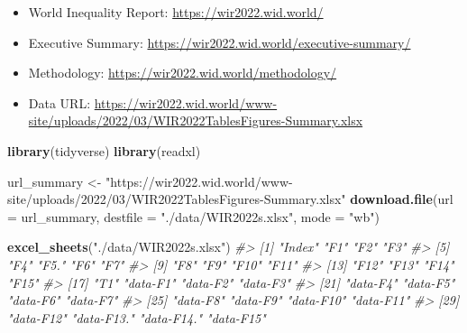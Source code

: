 \documentclass[
  xelatex, ja=standard]{bxjsbook}
\newenvironment{Shaded}{\begin{snugshade}}{\end{snugshade}}
\newcommand{\AttributeTok}[1]{\textcolor[rgb]{0.13,0.29,0.53}{#1}}
\newcommand{\CommentTok}[1]{\textcolor[rgb]{0.56,0.35,0.01}{\textit{#1}}}
\newcommand{\FunctionTok}[1]{\textcolor[rgb]{0.13,0.29,0.53}{\textbf{#1}}}
\newcommand{\NormalTok}[1]{#1}
\newcommand{\OtherTok}[1]{\textcolor[rgb]{0.56,0.35,0.01}{#1}}
\newcommand{\StringTok}[1]{\textcolor[rgb]{0.31,0.60,0.02}{#1}}
\providecommand{\tightlist}{%
  \setlength{\itemsep}{0pt}\setlength{\parskip}{0pt}}
\theoremstyle{definition}
\theoremstyle{definition}
\theoremstyle{definition}
\theoremstyle{definition}
\theoremstyle{remark}
\begin{document}
\begin{itemize}
\tightlist
\item
  World Inequality Report: \url{https://wir2022.wid.world/}
\item
  Executive Summary: \url{https://wir2022.wid.world/executive-summary/}
\item
  Methodology: \url{https://wir2022.wid.world/methodology/}
\item
  Data URL: \url{https://wir2022.wid.world/www-site/uploads/2022/03/WIR2022TablesFigures-Summary.xlsx}
\end{itemize}

\begin{Shaded}
\begin{Highlighting}[]
\FunctionTok{library}\NormalTok{(tidyverse)}
\FunctionTok{library}\NormalTok{(readxl)}
\end{Highlighting}
\end{Shaded}

\begin{Shaded}
\begin{Highlighting}[]
\NormalTok{url\_summary }\OtherTok{\textless{}{-}} \StringTok{"https://wir2022.wid.world/www{-}site/uploads/2022/03/WIR2022TablesFigures{-}Summary.xlsx"}
\FunctionTok{download.file}\NormalTok{(}\AttributeTok{url =}\NormalTok{ url\_summary, }\AttributeTok{destfile =} \StringTok{"./data/WIR2022s.xlsx"}\NormalTok{, }\AttributeTok{mode =} \StringTok{"wb"}\NormalTok{) }
\end{Highlighting}
\end{Shaded}

\begin{Shaded}
\begin{Highlighting}[]
\FunctionTok{excel\_sheets}\NormalTok{(}\StringTok{"./data/WIR2022s.xlsx"}\NormalTok{)}
\CommentTok{\#\textgreater{}  [1] "Index"     "F1"        "F2"        "F3"       }
\CommentTok{\#\textgreater{}  [5] "F4"        "F5."       "F6"        "F7"       }
\CommentTok{\#\textgreater{}  [9] "F8"        "F9"        "F10"       "F11"      }
\CommentTok{\#\textgreater{} [13] "F12"       "F13"       "F14"       "F15"      }
\CommentTok{\#\textgreater{} [17] "T1"        "data{-}F1"   "data{-}F2"   "data{-}F3"  }
\CommentTok{\#\textgreater{} [21] "data{-}F4"   "data{-}F5"   "data{-}F6"   "data{-}F7"  }
\CommentTok{\#\textgreater{} [25] "data{-}F8"   "data{-}F9"   "data{-}F10"  "data{-}F11" }
\CommentTok{\#\textgreater{} [29] "data{-}F12"  "data{-}F13." "data{-}F14." "data{-}F15"}
\end{Highlighting}
\end{Shaded}
\end{document}
